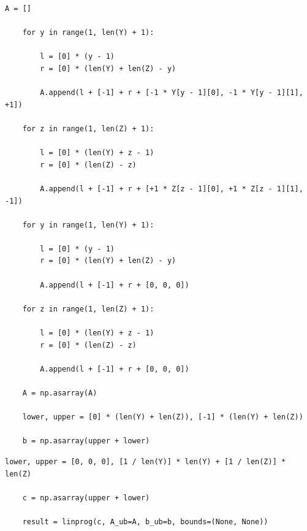\documentclass[12pt]{article}
\begin{document}
\begin{lstlisting}[caption={Calculating matrix \textbf{A} and vector \textbf{b}}]
    A = []

    for y in range(1, len(Y) + 1):

        l = [0] * (y - 1)
        r = [0] * (len(Y) + len(Z) - y)

        A.append(l + [-1] + r + [-1 * Y[y - 1][0], -1 * Y[y - 1][1], +1])

    for z in range(1, len(Z) + 1):

        l = [0] * (len(Y) + z - 1)
        r = [0] * (len(Z) - z)

        A.append(l + [-1] + r + [+1 * Z[z - 1][0], +1 * Z[z - 1][1], -1])

    for y in range(1, len(Y) + 1):

        l = [0] * (y - 1)
        r = [0] * (len(Y) + len(Z) - y)

        A.append(l + [-1] + r + [0, 0, 0])

    for z in range(1, len(Z) + 1):

        l = [0] * (len(Y) + z - 1)
        r = [0] * (len(Z) - z)

        A.append(l + [-1] + r + [0, 0, 0])

    A = np.asarray(A)

    lower, upper = [0] * (len(Y) + len(Z)), [-1] * (len(Y) + len(Z))

    b = np.asarray(upper + lower)
\end{lstlisting}

\pagebreak

\begin{lstlisting}[caption={Defining vector \textbf{c} and finding a solution to the problem}]
    lower, upper = [0, 0, 0], [1 / len(Y)] * len(Y) + [1 / len(Z)] * len(Z)

    c = np.asarray(upper + lower)

    result = linprog(c, A_ub=A, b_ub=b, bounds=(None, None))
\end{lstlisting}
\end{document}
